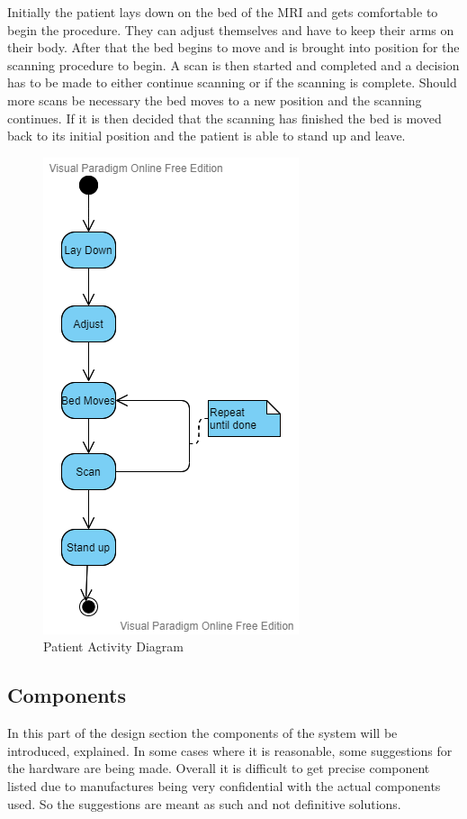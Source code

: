 \documentclass[conference]{IEEEtran}
\begin{document}
    Initially the patient lays down on the bed of the MRI and gets comfortable to begin the procedure. They can adjust themselves and have to keep their arms on their body. After that the bed begins to move and is brought into position for the scanning procedure to begin. A scan is then started and completed and a decision has to be made to either continue scanning or if the scanning is complete. Should more scans be necessary the bed moves to a new position and the scanning continues. If it is then decided that the scanning has finished the bed is moved back to its initial position and the patient is able to stand up and leave.
    
    \begin{figure}[htbp]
    \centerline{\includegraphics[scale = 0.5]{Pictures/actyp.png}}
    \caption{Patient Activity Diagram}
    \label{activity}
    \end{figure}   
    
    
    
    \subsection{Components}
    
    In this part of the design section the components of the system will be introduced, explained. In some cases where it is reasonable, some suggestions for the hardware are being made. Overall it is difficult to get precise component listed due to manufactures being very confidential with the actual components used. So the suggestions are meant as such and not definitive solutions.
    
\end{document}

